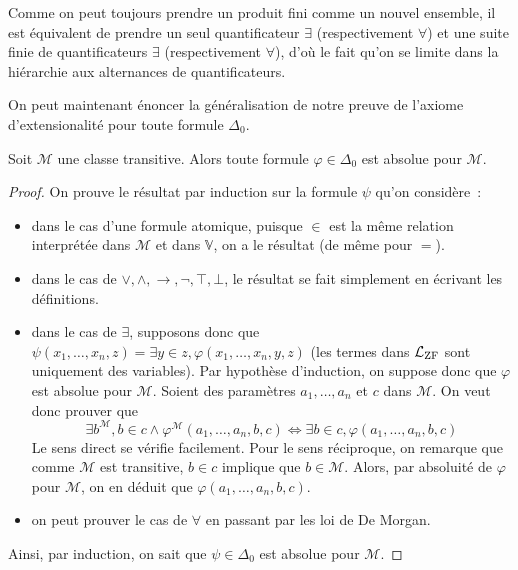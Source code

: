 \begin{remark}
  Comme on peut toujours prendre un produit fini comme un nouvel ensemble, il
  est équivalent de prendre un seul quantificateur $\exists$ (respectivement
  $\forall$) et une suite finie de quantificateurs $\exists$ (respectivement
  $\forall$), d'où le fait qu'on se limite dans la hiérarchie aux alternances
  de quantificateurs.
\end{remark}

On peut maintenant énoncer la généralisation de notre preuve de l'axiome
d'extensionalité pour toute formule $\Delta_0$.

\begin{proposition}
  Soit $\mathcal M$ une classe transitive. Alors toute formule
  $\varphi\in\Delta_0$ est absolue pour $\mathcal M$.
\end{proposition}

\begin{proof}
  On prouve le résultat par induction sur la formule $\psi$ qu'on considère~:
  \begin{itemize}
  \item dans le cas d'une formule atomique, puisque $\in$ est la même relation
    interprétée dans $\mathcal M$ et dans $\mathbb V$, on a le résultat (de
    même pour $=$).
  \item dans le cas de $\lor,\land,\to,\lnot,\top,\bot$, le résultat se fait
    simplement en écrivant les définitions.
  \item dans le cas de $\exists$, supposons donc que
    $\psi(x_1,\ldots,x_n,z) = \exists y \in z,\varphi(x_1,\ldots,x_n,y,z)$
    (les termes dans $\mathcal L_{\operatorname{ZF}}$ sont uniquement des variables). Par
    hypothèse d'induction, on suppose donc que $\varphi$ est absolue pour
    $\mathcal M$. Soient des paramètres $a_1,\ldots,a_n$ et $c$ dans
    $\mathcal M$. On veut donc prouver que
    \[\exists b^{\mathcal M}, b \in c \land \varphi^{\mathcal M}(a_1,\ldots,a_n,b,c)
    \iff \exists b \in c, \varphi(a_1,\ldots,a_n,b,c)\]
    Le sens direct se vérifie facilement. Pour le sens réciproque, on
    remarque que comme $\mathcal M$ est transitive, $b \in c$ implique que
    $b \in \mathcal M$. Alors, par absoluité de $\varphi$ pour $\mathcal M$,
    on en déduit que $\varphi(a_1,\ldots,a_n,b,c)$.
  \item on peut prouver le cas de $\forall$ en passant par les loi de De Morgan.
  \end{itemize}
  Ainsi, par induction, on sait que $\psi \in \Delta_0$ est absolue pour
  $\mathcal M$.
\end{proof}

